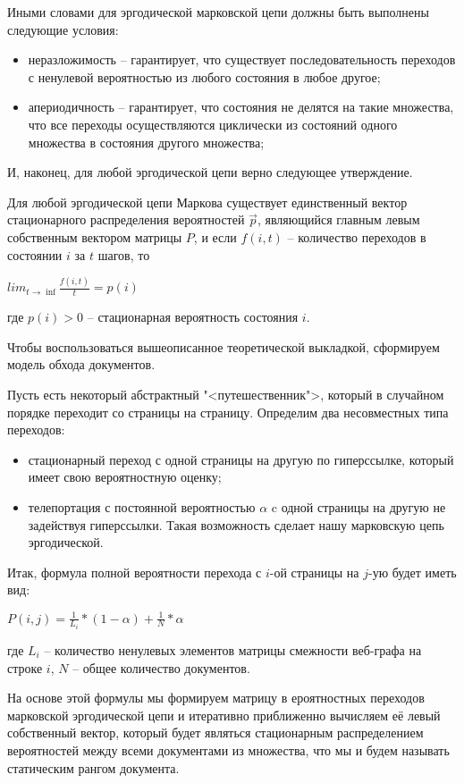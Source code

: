 Иными словами для эргодической марковской цепи должны быть выполнены следующие условия:
\begin{itemize}
\item неразложимость -- гарантирует, что существует последовательность переходов с ненулевой вероятностью из любого состояния в любое другое;
\item апериодичность -- гарантирует, что состояния не делятся на такие множества, что все переходы осуществляются циклически из состояний одного множества в состояния другого множества;
\end{itemize}

И, наконец, для любой эргодической цепи верно следующее утверждение.

Для любой эргодической цепи Маркова существует единственный вектор стационарного распределения вероятностей $\vec{p}$, являющийся главным левым собственным вектором матрицы $P$, и если $f(i, t)$ -- количество переходов в состоянии $i$ за $t$ шагов, то 

\begin{center}
$lim_{t \to \inf}\frac{f(i, t)}{t}=p(i)$
\end{center} где $p(i) > 0$ -- стационарная вероятность состояния $i$.

Чтобы воспользоваться вышеописанное теоретической выкладкой, сформируем модель обхода документов.

Пусть есть некоторый абстрактный "<путешественник">, который в случайном порядке переходит со страницы на страницу.
Определим два несовместных типа переходов:
\begin{itemize}
\item стационарный переход с одной страницы на другую по гиперссылке, который имеет свою вероятностную оценку;
\item телепортация с постоянной вероятностью $\alpha$ c одной страницы на другую не задействуя гиперссылки. Такая возможность сделает нашу марковскую цепь эргодической.
\end{itemize}

Итак, формула полной вероятности перехода с $i$-ой страницы на $j$-ую будет иметь вид:

\begin{center}
$P(i, j) = \frac{1}{L_i} * (1 - \alpha) + \frac{1}{N} * \alpha$
\end{center} где $L_i$ -- количество ненулевых элементов матрицы смежности веб-графа на строке $i$, $N$ -- общее количество документов.

На основе этой формулы мы формируем матрицу в ероятностных переходов марковской эргодической цепи и итеративно приближенно вычисляем её левый собственный вектор, который будет являться стационарным распределением вероятностей между всеми документами из множества, что мы и будем называть статическим рангом документа.

